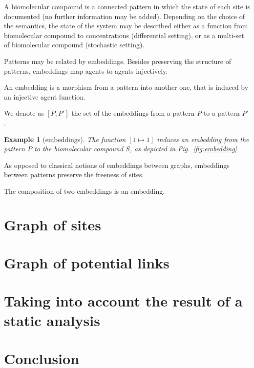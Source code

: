 \documentclass{entcs}
\newtheorem{myexample}[thm]{Example}
\begin{document}
A biomolecular compound is a connected pattern in which the state of each site is documented (no further information may be added). Depending on the choice of the semantics, the state of the system may be described either as a function from biomolecular compound to concentrations (differential setting), or as a multi-set of biomolecular compound  (stochastic setting).

Patterns may be related by embeddings. Besides preserving the structure of patterns, embeddings map agents to agents injectively.

\begin{defn}[embeddings]
  An embedding is a morphism from a pattern into another one, that is induced by an injective agent function.

  We denote as $[P,P']$ the set of the embeddings from a pattern $P$ to a pattern $P'$.
\end{defn}

\begin{myexample}[embeddings]
  The function $[1\mapsto 1]$ induces an embedding from the pattern $P$ to the biomolecular compound $S$, as depicted in Fig.~\ref{fig:embedding}. %
\end{myexample}

As opposed to classical notions of embeddings between graphs, embeddings between patterns preserve the freeness of sites.

The composition of two embeddings is an embedding.

\section{Graph of sites}

\section{Graph of potential links}

\section{Taking into account the result of a static analysis}

\section{Conclusion}



\end{document}
